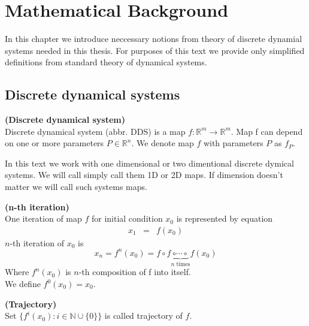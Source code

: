 \chapter{Mathematical Background}
In this chapter we introduce neccessary notions from theory of discrete dynamial systems needed in this thesis.
For purposes of this text we provide only simplified definitions from standard theory of dynamical systems.

\section{Discrete dynamical systems}

\begin{definition} \textbf{(Discrete dynamical system)} \\
    Discrete dynamical system (abbr. DDS) is a map $f: \mathbb{R}^{m} \rightarrow \mathbb{R}^{m}$.
    Map f can depend on one or more parameters $P \in \mathbb{R}^n$.
    We denote map $f$ with parameters $P$ as $f_P$.
\end{definition}

\begin{remark}
    In this text we work with one dimensional or two dimentional discrete dymical systems.
    We will call simply call them 1D or 2D maps.
    If dimension doesn't matter we will call such systems maps.
\end{remark}

\begin{definition} \textbf{(n-th iteration)} \\
    One iteration of map $f$ for initial condition $x_0$ is represented by equation
    \begin{eqnarray}
        x_{1}  & = & f(x_{0})
    \end{eqnarray}
    $n$-th iteration of $x_0$ is
    \begin{equation}
        x_{n} = f^{n}(x_0) = f \circ f \underbrace{\circ \cdots \circ}_\text{$n$ times} f(x_0)
    \end{equation}
    Where $f^{n}(x_0)$ is $n$-th composition of f into itself. \\
    We define $f^{0}(x_0) = x_0$.
\end{definition}

\begin{definition} \textbf{(Trajectory)} \\
    Set $\{f^i(x_0):i \in \mathbb{N} \cup \{0\} \}$ is called trajectory of $f$.
\end{definition}

